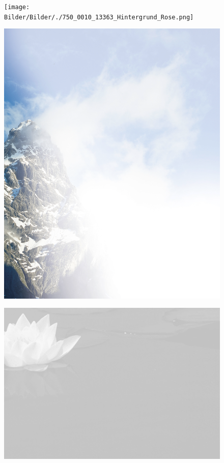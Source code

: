 \documentclass[ngerman,a4paper,11pt]{scrreprt}
\begin{document}
\begin{figure}[H]
\centering
\texttt{[image: Bilder/Bilder/./750\_0010\_13363\_Hintergrund\_Rose.png]}
\end{figure}

\begin{figure}[H]
\centering
\includegraphics[width=\textwidth,height=.8\textheight]{Bilder/Bilder/./750_0010_13876_Hintergrund_Einklang_Todesanzeige.png}
\end{figure}

\begin{figure}[H]
\centering
\includegraphics[width=\textwidth,height=.8\textheight]{Bilder/Bilder/./750_0010_13964_1070679_Hintergrund_mit_Seerose.png}
\end{figure}
\end{document}
